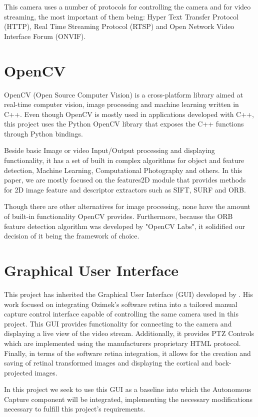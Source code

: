 \documentclass{l4proj}
\begin{document}
This camera uses a number of protocols for controlling the camera and for video streaming, the most important of them being: Hyper Text Transfer Protocol (HTTP), Real Time Streaming Protocol (RTSP) and Open Network Video Interface Forum (ONVIF). 


\section{OpenCV}

OpenCV (Open Source Computer Vision) is a cross-platform library aimed at real-time computer vision, image processing and machine learning written in C++. Even though OpenCV is mostly used in applications developed with C++, this project uses the Python OpenCV library that exposes the C++ functions through Python bindings.    

Beside basic Image or video Input/Output processing and displaying functionality, it has a set of built in complex algorithms for object and feature detection, Machine Learning, Computational Photography and others. In this paper, we are mostly focused on the features2D module that provides methods for 2D image feature and descriptor extractors such as SIFT, SURF and ORB.

Though there are other alternatives for image processing, none have the amount of built-in functionality OpenCV provides. Furthermore, because the ORB feature detection algorithm was developed by "OpenCV Labs", it solidified our decision of it being the framework of choice. 

\section{Graphical User Interface}

This project has inherited the Graphical User Interface (GUI) developed by \cite{JianwenZhou}. His work focused on integrating Ozimek's software retina into a tailored manual capture control interface capable of controlling the same camera used in this project. This GUI provides functionality for connecting to the camera and displaying a live view of the video stream. Additionally, it provides PTZ Controls which are implemented using the manufacturers proprietary HTML protocol. Finally, in terms of the software retina integration, it allows for the creation and saving of retinal transformed images and displaying the cortical and back-projected images.

In this project we seek to use this GUI as a baseline into which the Autonomous Capture component will be integrated, implementing the necessary modifications necessary to fulfill this project's requirements. 
\end{document}
